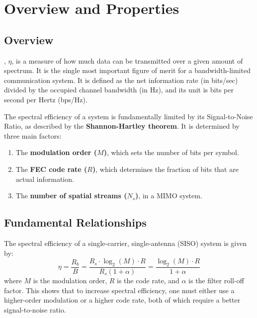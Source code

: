 \section{Overview and Properties}

\subsection{Overview}

, $\eta$, is a measure of how much data can be transmitted over a given amount of spectrum. It is the single most important figure of merit for a bandwidth-limited communication system. It is defined as the net information rate (in bits/sec) divided by the occupied channel bandwidth (in Hz), and its unit is bits per second per Hertz (bps/Hz).

\begin{keyconcept}
    The spectral efficiency of a system is fundamentally limited by its Signal-to-Noise Ratio, as described by the \textbf{Shannon-Hartley theorem}. It is determined by three main factors:
    \begin{enumerate}
        \item The \textbf{modulation order ($M$)}, which sets the number of bits per symbol.
        \item The \textbf{FEC code rate ($R$)}, which determines the fraction of bits that are actual information.
        \item The \textbf{number of spatial streams ($N_s$)}, in a MIMO system.
    \end{enumerate}
\end{keyconcept}


\subsection{Fundamental Relationships}

The spectral efficiency of a single-carrier, single-antenna (SISO) system is given by:
\begin{equation}
    \eta = \frac{R_b}{B} = \frac{R_s \cdot \log_2(M) \cdot R}{R_s(1+\alpha)} = \frac{\log_2(M) \cdot R}{1+\alpha}
\end{equation}
where $M$ is the modulation order, $R$ is the code rate, and $\alpha$ is the filter roll-off factor. This shows that to increase spectral efficiency, one must either use a higher-order modulation or a higher code rate, both of which require a better signal-to-noise ratio.


